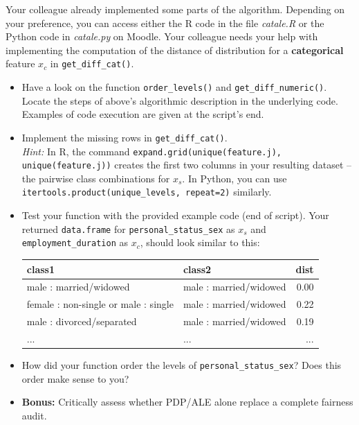 {\begin{enumerate}[a)]
Your colleague already implemented some parts of the algorithm.
Depending on your preference, you can access either the R code in the file \textit{catale.R} or the Python code in \textit{catale.py} on Moodle.
Your colleague needs your help with implementing the computation of the distance of distribution for a \textbf{categorical} feature $x_c$ in \texttt{get\_diff\_cat()}. 

\begin{itemize}
  \item Have a look on the function \texttt{order\_levels()} and \texttt{get\_diff\_numeric()}. 
  Locate the steps of above's  algorithmic description in the underlying code.
  Examples of code execution are given at the script's end. 
  \item Implement the missing rows in \texttt{get\_diff\_cat()}.\\
  \textit{Hint:} In R, the command \texttt{expand.grid(unique(feature.j), unique(feature.j))} creates the first two columns in
your resulting dataset -- the pairwise class combinations for $x_s$. In Python, you can use \texttt{itertools.product(unique\_levels, repeat=2)} similarly.
  \item Test your function with the provided example code (end of script). 
  Your returned \texttt{data.frame} for \texttt{personal\_status\_sex} as $x_s$ 
  and \texttt{employment\_duration} as $x_c$, should look 
  similar to this: 

\begin{table}[ht]
\centering
\begin{tabular}{llr}
  \hline
 class1 & class2 & dist \\ 
  \hline
male : married/widowed & male : married/widowed & 0.00 \\ 
female : non-single or male : single & male : married/widowed & 0.22 \\ 
male : divorced/separated & male : married/widowed & 0.19 \\ 
  ... & ... & ... \\
   \hline
\end{tabular}
\end{table}

\item How did your function order the levels of \texttt{personal\_status\_sex}? 
Does this order make sense to you? 

\item \textbf{Bonus:} Critically assess whether PDP/ALE alone replace a complete fairness audit.

\end{itemize}
\end{enumerate}
}